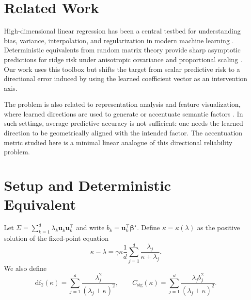\documentclass{article}
\newcommand{\btrue}{\boldsymbol{\beta}^{\star}}
\newcommand{\uhat}{\mathbf{u}}
\newcommand{\df}{\mathrm{df}_{2}}
\begin{document}
\section{Related Work}

High-dimensional linear regression has been a central testbed for understanding bias, variance, interpolation, and regularization in modern machine learning \citep{dobriban2018high,hastie2022surprises,mei2022generalization}. Deterministic equivalents from random matrix theory provide sharp asymptotic predictions for ridge risk under anisotropic covariance and proportional scaling \citep{bai2010spectral,couillet2011random}. Our work uses this toolbox but shifts the target from scalar predictive risk to a directional error induced by using the learned coefficient vector as an intervention axis.

The problem is also related to representation analysis and feature visualization, where learned directions are used to generate or accentuate semantic factors \citep{olah2017feature,bau2017network}. In such settings, average predictive accuracy is not sufficient: one needs the learned direction to be geometrically aligned with the intended factor. The accentuation metric studied here is a minimal linear analogue of this directional reliability problem.

\section{Setup and Deterministic Equivalent}

Let $\Sigma=\sum_{k=1}^{d}\lambda_k \uhat_k\uhat_k^\top$ and write $b_k=\uhat_k^\top\btrue$. Define $\kappa=\kappa(\lambda)$ as the positive solution of the fixed-point equation
\begin{equation}
    \kappa-\lambda
    = \gamma\kappa \frac{1}{d}\sum_{j=1}^{d}\frac{\lambda_j}{\kappa+\lambda_j}.
    \label{eq:kappa}
\end{equation}
We also define
\begin{equation}
    \df(\kappa)=\sum_{j=1}^{d}\frac{\lambda_j^2}{(\lambda_j+\kappa)^2},
    \qquad
    C_{\mathrm{sig}}(\kappa)=\sum_{j=1}^{d}\frac{\lambda_j b_j^2}{(\lambda_j+\kappa)^2}.
\end{equation}
\end{document}
